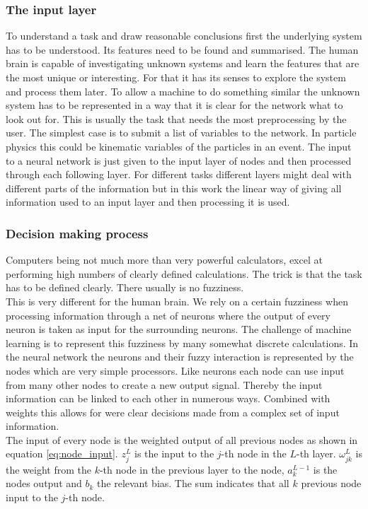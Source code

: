 \subsubsection{The input layer}

To understand a task and draw reasonable conclusions first the underlying system has to be understood. Its features need to be found and summarised. The human brain is capable of investigating unknown systems and learn the features that are the most unique or interesting. For that it has its senses to explore the system and process them later. To allow a machine to do something similar the unknown system has to be represented in a way that it is clear for the network what to look out for. This is usually the task that needs the most preprocessing by the user. The simplest case is to submit a list of variables to the network. In particle physics this could be kinematic variables of the particles in an event.
The input to a neural network is just given to the input layer of nodes and then processed through each following layer. For different tasks different layers might deal with different parts of the information but in this work the linear way of giving all information used to an input layer and then processing it is used.

\subsubsection{Decision making process}

Computers being not much more than very powerful calculators, excel at performing high numbers of clearly defined calculations. The trick is that the task has to be defined clearly. There usually is no fuzziness.\\
This is very different for the human brain. We rely on a certain fuzziness when processing information through a net of neurons where the output of every neuron is taken as input for the surrounding neurons. The challenge of machine learning is to represent this fuzziness by many somewhat discrete calculations. In the neural network the neurons and their fuzzy interaction is represented by the nodes which are very simple processors. Like neurons each node can use input from many other nodes to create a new output signal. Thereby the input information can be linked to each other in numerous ways. Combined with weights this allows for were clear decisions made from a complex set of input information.\\
The input of every node is the weighted output of all previous nodes as shown in equation \eqref{eq:node_input}. $z_j^L$ is the input to the $j$-th node in the $L$-th layer. $\omega_{jk}^L$ is the weight from the $k$-th node in the previous layer to the node, $a_k^{L-1}$ is the nodes output and $b_k$ the relevant bias. The sum indicates that all $k$ previous node input to the $j$-th node.

